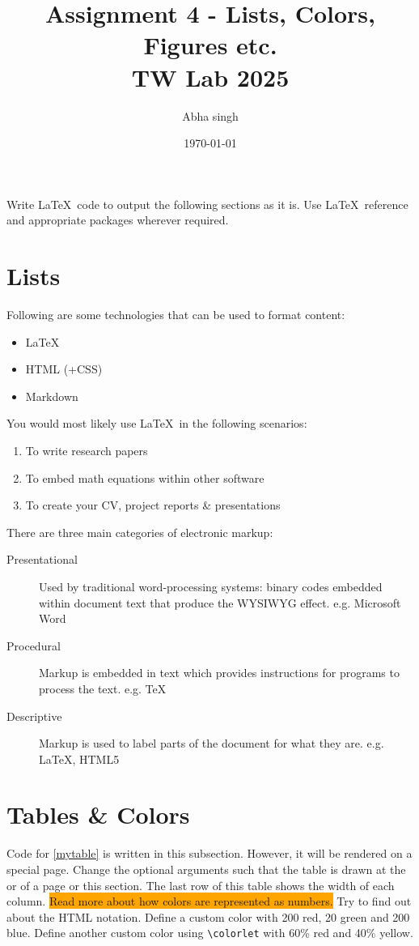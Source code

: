 \documentclass{article}
\title{Assignment 4 - Lists, Colors, Figures etc.\\TW Lab 2025}
\author{Abha singh}
\date{\today}
\begin{document}
\maketitle

\noindent
Write \LaTeX\ code to output the following sections as it is.
Use \LaTeX\ reference and appropriate packages wherever required.

\section{Lists}

Following are some technologies that can be used to format content:

\begin{itemize}
\item \LaTeX
\item HTML (+CSS)
\item Markdown
\end{itemize}
You would most likely use \LaTeX\ in the following scenarios:
\begin{enumerate}
\item To write research papers
\item To embed math equations within other software
\item To create your CV, project reports \& presentations
\end{enumerate}
There are three main categories of electronic markup:
\begin{description}
\item[Presentational] Used by traditional word-processing systems:
binary codes embedded within document text that produce the WYSIWYG
effect. e.g. Microsoft Word
\item[Procedural] Markup is embedded in text which provides instructions
for programs to process the text. e.g. \TeX
\item[Descriptive] Markup is used to label parts of the document for
what they are. e.g. \LaTeX, HTML5
\end{description}
\vspace{7cm}
\section{Tables \& Colors}
Code for \ref{mytable} is written in this subsection. However, it will
be rendered on a special page. Change the optional arguments such that the table is drawn at the
 or
 of a page or
 this section. The last row of this table shows the width
of each column.
\smallskip
\colorbox{orange}{Read more about how colors are represented as numbers.}
Try to find out about the HTML notation. Define a custom color with 200 red, 20 green and 200 blue. Define another custom color using
\texttt{\textbackslash colorlet} with 60\% red and 40\% yellow.
\end{document}
